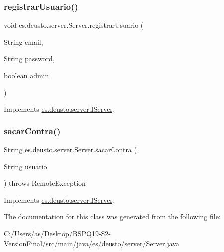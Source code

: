\mbox{\label{classes_1_1deusto_1_1server_1_1_server_a0f79b8db6904facdae94410e26bef452}} 
\subsubsection{\texorpdfstring{registrarUsuario()}{registrarUsuario()}}
{\footnotesize\ttfamily void es.\+deusto.\+server.\+Server.\+registrar\+Usuario (\begin{DoxyParamCaption}\item[{String}]{email,  }\item[{String}]{password,  }\item[{boolean}]{admin }\end{DoxyParamCaption})}



Implements \mbox{\hyperlink{interfacees_1_1deusto_1_1server_1_1_i_server_af6743c655c7831fa6d87e6e910bb6db4}{es.\+deusto.\+server.\+I\+Server}}.

\mbox{\label{classes_1_1deusto_1_1server_1_1_server_aefe051d880626950ea2964d89a4ae3c3}} 
\subsubsection{\texorpdfstring{sacarContra()}{sacarContra()}}
{\footnotesize\ttfamily String es.\+deusto.\+server.\+Server.\+sacar\+Contra (\begin{DoxyParamCaption}\item[{String}]{usuario }\end{DoxyParamCaption}) throws Remote\+Exception}



Implements \mbox{\hyperlink{interfacees_1_1deusto_1_1server_1_1_i_server_a950b819a4f67edf0ef76221dd4714d47}{es.\+deusto.\+server.\+I\+Server}}.



The documentation for this class was generated from the following file\+:\begin{DoxyCompactItemize}
\item 
C\+:/\+Users/as/\+Desktop/\+B\+S\+P\+Q19-\/\+S2-\/\+Version\+Final/src/main/java/es/deusto/server/\mbox{\hyperlink{_server_8java}{Server.\+java}}\end{DoxyCompactItemize}
